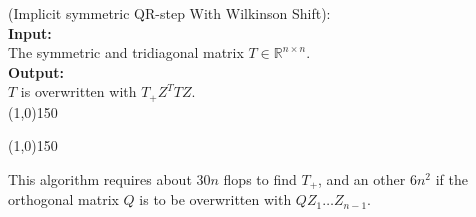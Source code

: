 \begin{algo}
{
%
	(Implicit symmetric QR-step With Wilkinson Shift):
%
}\\
\textbf{Input: }
{
%
	\\The symmetric and tridiagonal matrix $T\in\mathbb R^{n\times n}$.
%
}\\
\textbf{Output: }
{
%
	\\$T$ is overwritten with $T_+Z^TTZ$.
%
}\\
\line(1,0){150}
\begin{algorithmic}
%
	\EndIf{}
\EndFor{}
%
\end{algorithmic}
\label{algImplicitQRStep}
\line(1,0){150}
\end{algo}
%
This algorithm requires about $30n$ flops to find $T_+$, and an other $6n^2$ if the orthogonal matrix
$Q$ is to be overwritten with $QZ_1\dots Z_{n-1}$.
%
